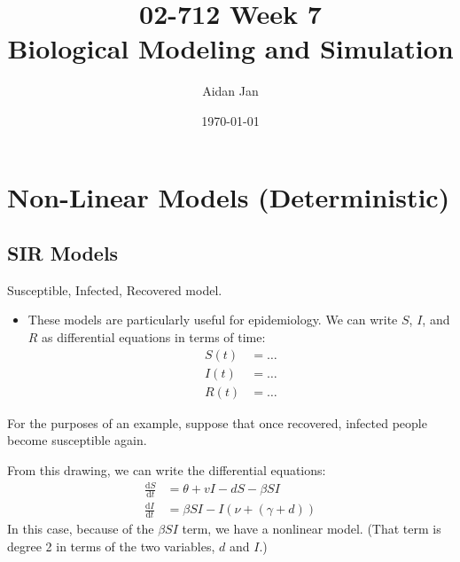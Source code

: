 \documentclass[10pt]{article}
\title{02-712 Week 7 \\ \large{Biological Modeling and Simulation}}
\author{Aidan Jan}
\date{\today}
\newcommand{\dd}{\text{d}}
\begin{document}
\maketitle

\section*{Non-Linear Models (Deterministic)}

\subsection*{SIR Models}
Susceptible, Infected, Recovered model.
\begin{itemize}
	\item These models are particularly useful for epidemiology.  We can write $S$, $I$, and $R$ as differential equations in terms of time:
	\begin{align*}
        S(t) &= \dots\\
        I(t) &= \dots\\
        R(t) &= \dots
    \end{align*}
\end{itemize}
For the purposes of an example, suppose that once recovered, infected people become susceptible again.
\begin{center}
\end{center}

From this drawing, we can write the differential equations:
\begin{align*}
    \frac{\dd S}{\dd t} &= \theta + vI - dS - \beta SI\\
    \frac{\dd I}{\dd t} &= \beta SI - I(\nu + (\gamma + d))
\end{align*}
In this case, because of the $\beta SI$ term, we have a nonlinear model.  (That term is degree 2 in terms of the two variables, $d$ and $I$.)
\end{document}
